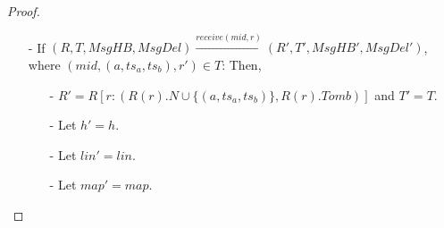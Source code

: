 {\begin {proof}
\begin{itemize}
    If the first possibility holds, then there exists items $d_1,\ldots,d_k$, such that in $R(r).N$, $b$ is a son of $d_1$, $d_1$ is a son of $d_2$, $\ldots$, and $d_k$ is a son of $a$. It is easy to see that $(\mathit{add}(a,\_),\mathit{add}(d_k,a)),(\mathit{add}(d_k,a),\mathit{add}(d_{\mathit{k-1}},d_k)), \ldots, (\mathit{add}(d_1,d_2),\mathit{add}(b,d_1)) \in h.\mathit{vis}$. Since $\mathit{lin}$ is consistent with visibility relation, we know that in $\mathit{lin}$, $\mathit{add}(a,\_)$ is before $\mathit{add}(d_k,a)$, $\mathit{add}(d_k,a)$ is before $\mathit{add}(d_{\mathit{k-1}},d_k)$, $\ldots$, and $\mathit{add}(d_1,d_2)$ is before $\mathit{add}(b,d_1)$. According to $\mathit{list}_s^{\mathit{af}}$, it is easy to see that in $a$ is before $b$ in $l_1$.

    If the second possibility holds, then it is easy to see that $(\mathit{add}(c_2,c_1),\mathit{add}(a,c_2)),$ $(\mathit{add}(c_1,\_),\mathit{add}(c_2,c_1)), (\mathit{add}(c_3,c_1),\mathit{add}(b,c_3)),(\mathit{add}(c_1,\_),\mathit{add}(c_3,c_1)), \in h.\mathit{vis}$. Since $\mathit{lin}$ is consistent with visibility relation and time-stamp, we know that in $\mathit{lin}$, $\mathit{add}(c_3,c_1)$ is before $\mathit{add}(c_2,c_1)$, $\mathit{add}(c_2,c_1)$ is before $\mathit{add}(a,c_2)$, and $\mathit{add}(c_3,c_1)$ is before $\mathit{add}(b,c_3)$. According to $\mathit{list}_s^{\mathit{af}}$, it is easy to see that in $a$ is before $b$ in $l_1$.

    Therefore, $h'$ is distributed linearizable and $\mathit{lin}'$ is a linearization.

\item[-] If $(R,T,\mathit{MsgHB},\mathit{MsgDel}) {\xrightarrow{\mathit{receive}(\mathit{mid},r)}} (R',T',\mathit{MsgHB}',\mathit{MsgDel}')$, where $(\mathit{mid},(a,\mathit{ts}_a,\mathit{ts}_b),r') \in T$: Then,

    \begin{itemize}
    \setlength{\itemsep}{0.5pt}
    \item[-] $R' = R[ r: ( R(r).N \cup \{ (a,\mathit{ts}_a,\mathit{ts}_b) \}, R(r).\mathit{Tomb} ) ]$ and $T' = T$.

    \item[-] Let $h' = h$.

    \item[-] Let $\mathit{lin}' = \mathit{lin}$.

    \item[-] Let $\mathit{map}' = \mathit{map}$.
    \end{itemize}


\end{itemize}
\end{proof}}
